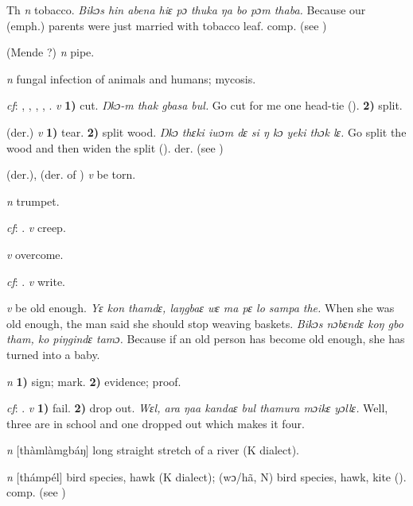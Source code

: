 \begin{letter}{Th}
 \textit{n} tobacco. \textit{Bikɔs hin abena hiɛ pɔ thuka ŋa bo pɔm thaba.} Because our (emph.) parents were just married with tobacco leaf. comp.  (see ) 

 (Mende ?) \textit{n} pipe.

 \textit{n} fungal infection of animals and humans; mycosis.

 \textit{cf}: , , , , . \textit{v} \textbf{1)} cut. \textit{Ŋkɔ-m thak gbasa bul.} Go cut for me one head-tie (\citealt{Pichl1967}). \textbf{2)} split.

 (der.) \textit{v} \textbf{1)} tear. \textbf{2)} split wood. \textit{Ŋkɔ thɛki iwɔm dɛ si ŋ kɔ yeki thɔk lɛ.} Go split the wood and then widen the split (\citealt{Pichl1967}). der.  (see ) 

 (der.), (der. of ) \textit{v} be torn. 

 \textit{n} trumpet.

 \textit{cf}: . \textit{v} creep.

 \textit{v} overcome.

 \textit{cf}: . \textit{v} write.

 \textit{v} be old enough. \textit{Yɛ kon thamdɛ, laŋgbaɛ wɛ ma pɛ lo sampa the.} When she was old enough, the man said she should stop weaving baskets. \textit{Bikɔs nɔbɛndɛ koŋ gbo tham, ko piŋgindɛ tamɔ.} Because if an old person has become old enough, she has turned into a baby.

 \textit{n} \textbf{1)} sign; mark. \textbf{2)} evidence; proof.

 \textit{cf}: . \textit{v} \textbf{1)} fail. \textbf{2)} drop out. \textit{Wɛl, ara ŋaa kandaɛ bul thamura mɔikɛ yɔllɛ.} Well, three are in school and one dropped out which makes it four.

 \textit{n} [thàmlàmgbáŋ] long straight stretch of a river (K dialect). 

 \textit{n} [thámpél] bird species, hawk (K dialect); (wɔ/hã, N) bird species, hawk, kite (\citealt{Pichl1967}). comp.  (see ) 


\end{letter}
